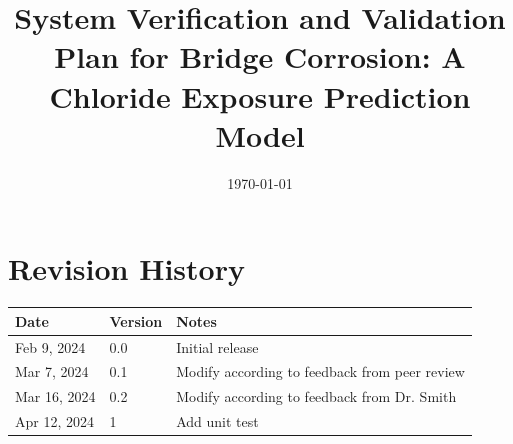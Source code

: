 \documentclass[12pt, titlepage]{article}
\begin{document}
\title{System Verification and Validation Plan for Bridge Corrosion: A Chloride Exposure Prediction Model} 
\author{\authname}
\date{\today}
	
\maketitle


\section*{Revision History}

\begin{tabularx}{\textwidth}{p{2.5cm}p{1.5cm}X}
\toprule {\bf Date} & {\bf Version} & {\bf Notes}\\
\midrule
Feb 9, 2024 & 0.0 & Initial release\\
Mar 7, 2024 & 0.1 & Modify according to feedback from peer review\\
Mar 16, 2024 & 0.2 & Modify according to feedback from Dr. Smith\\
Apr 12, 2024 & 1 & Add unit test\\
\bottomrule
\end{tabularx}



\newpage

\tableofcontents

\listoftables

\end{document}
